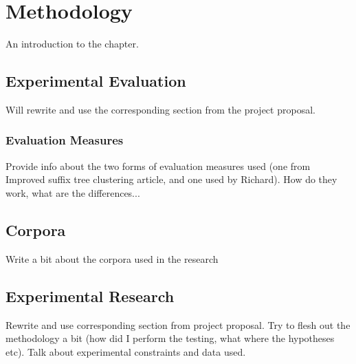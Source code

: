 
\chapter{Methodology} %

\label{Methodology} %


An introduction to the chapter.

\section{Experimental Evaluation}
\label{ExperimentalEvaluation}
Will rewrite and use the corresponding section from the project proposal.

\subsection{Evaluation Measures}
Provide info about the two forms of evaluation measures used (one from Improved suffix tree clustering article, and one used by Richard). How do they work, what are the differences...

\section{Corpora}
\label{Corpora}
Write a bit about the corpora used in the research

\section{Experimental Research}
\label{ExperimentalResearch}
Rewrite and use corresponding section from project proposal. Try to flesh out the methodology a bit (how did I perform the testing, what where the hypotheses etc). Talk about experimental constraints and data used.